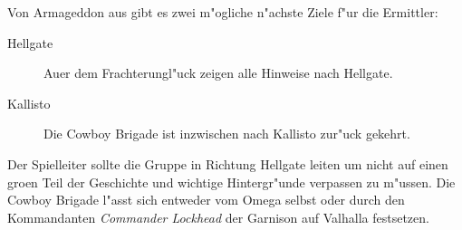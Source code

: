 
Von Armageddon aus gibt es zwei m"ogliche n"achste Ziele f"ur die Ermittler:

\begin{description}
	\item [Hellgate] Au\3er dem Frachterungl"uck zeigen alle Hinweise nach Hellgate.
	\item [Kallisto] Die Cowboy Brigade ist inzwischen nach Kallisto zur"uck gekehrt.
\end{description}

Der Spielleiter sollte die Gruppe in Richtung Hellgate leiten um nicht auf einen gro\3en Teil der Geschichte und wichtige Hintergr"unde verpassen zu m"ussen. Die Cowboy Brigade l"asst sich entweder vom Omega selbst oder durch den Kommandanten \textit{Commander Lockhead} der Garnison auf Valhalla festsetzen.

